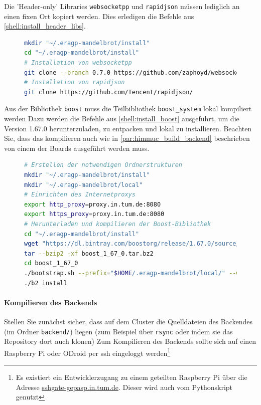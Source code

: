 Die 'Header-only' Libraries \verb|websocketpp| und \verb|rapidjson| müssen
lediglich an einen fixen Ort kopiert werden.
Dies erledigen die Befehle aus \autoref{shell:install_header_libs}.

\begin{figure}[h!]
	\begin{lstlisting}[language=bash, caption={Lokale Installation der Bibliotheken \texttt{websocketpp} und \texttt{rapidjson}.}, label={shell:install_header_libs}]
mkdir "~/.eragp-mandelbrot/install"
cd "~/.eragp-mandelbrot/install"
# Installation von websocketpp
git clone --branch 0.7.0 https://github.com/zaphoyd/websocketpp.git websocketpp --depth 1
# Installation von rapidjson
git clone https://github.com/Tencent/rapidjson/
    \end{lstlisting}
\end{figure}


Aus der Bibliothek \verb|boost| muss die Teilbibliothek \verb|boost_system| lokal kompiliert werden
Dazu werden die Befehle aus \autoref{shell:install_boost} ausgeführt,
um die Version 1.67.0 herunterzuladen, zu entpacken und lokal zu installieren.
Beachten Sie, dass das kompilieren auch wie in \autoref{par:himmuc_build_backend} beschrieben
von einem der Boards ausgeführt werden muss.

\begin{figure}[h!]
    \begin{lstlisting}[language=bash, caption={Lokale Installation der Bibliothek boost.}, label={shell:install_boost}]
# Erstellen der notwendigen Ordnerstrukturen
mkdir "~/.eragp-mandelbrot/install"
mkdir "~/.eragp-mandelbrot/local"
# Einrichten des Internetproxys
export http_proxy=proxy.in.tum.de:8080
export https_proxy=proxy.in.tum.de:8080
# Herunterladen und kompilieren der Boost-Bibliothek
cd "~/.eragp-mandelbrot/install"
wget "https://dl.bintray.com/boostorg/release/1.67.0/source/boost_1_67_0.tar.bz2"
tar --bzip2 -xf boost_1_67_0.tar.bz2
cd boost_1_67_0
./bootstrap.sh --prefix="$HOME/.eragp-mandelbrot/local/" --with-libraries=system
./b2 install
    \end{lstlisting}
\end{figure}

\paragraph{Kompilieren des Backends}\label{par:himmuc_build_backend}

Stellen Sie zunächst sicher, dass auf dem Cluster die Quelldateien des Backendes (im Ordner \verb|backend/|) liegen
(zum Beispiel über \verb|rsync| oder indem sie das Repository dort auch klonen)
Zum Kompilieren des Backends sollte sich auf einen Raspberry Pi oder ODroid
per ssh eingeloggt werden\footnote{Es existiert ein Entwicklerzugang zu einem geteilten Raspberry Pi über die Adresse \url{sshgate-gepasp.in.tum.de}. Dieser wird auch vom Pythonskript genutzt}

